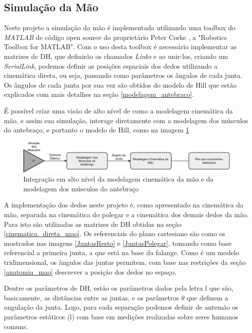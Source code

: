 \subsection{Simulação da Mão}
\label{simulacao_mao}
Neste projeto a simulação da mão é implementada utilizando uma toolbox do \textit{MATLAB} de código open source do proprietário Peter Corke \cite{corke1996robotics}, a "Robotics Toolbox for MATLAB". Com o uso desta toolbox é necessário implementar as matrizes de DH, que definirão os chamados \textit{Links} e ao unir-los, criando um \textit{SerialLink}, podemos definir as posições espaciais dos dedos utilizando a cinemática direta, ou seja, passando como parâmetros os ângulos de cada junta. Os ângulos de cada junta por sua vez são obtidos do modelo de Hill \cite{hill1938heat} que estão explicados com mais detalhes na seção \ref{modelagem_antebraco}. 

É possível criar uma visão de alto nível de como a modelagem cinemática da mão, e assim sua simulação, interage diretamente com a modelagem dos músculos do antebraço, e portanto o modelo de Hill, como na imagem \ref{IntegracaoAltoNivel}

\begin{figure}[H]
\centering
\includegraphics[width = 1\textwidth]{img/integracao_alto_nivel.JPG}
\caption[Integração em alto nível]{Integração em alto nível da modelagem cinemática da mão e da modelagem dos músculos do antebraço}
\label{IntegracaoAltoNivel}
\end{figure}

A implementação dos dedos neste projeto é, como apresentado na cinemática da mão, separada na cinemática do polegar e a cinemática dos demais dedos da mão. Para isto são utilizadas as matrizes de DH obtidas na seção \ref{cinematica_direta_mao}. Os referenciais do plano cartesiano são como os mostrados nas imagens \ref{JuntasResto} e \ref{JuntasPolegar}, tomando como base referencial a primeira junta, a que está na base da falange. Como é um modelo tridimensional, os ângulos das juntas permitem, com base nas restrições da seção \ref{anatomia_mao} descrever a posição dos dedos no espaço.

Dentre os parâmetros de DH, estão os parâmetros dados pela letra l que são, basicamente, as distâncias entre as juntas, e os parâmetros $\theta$ que definem a angulação da junta. Logo, para cada separação podemos definir de antemão os parâmetros estáticos (l) com base em medições realizadas sobre seres humanos comuns.

